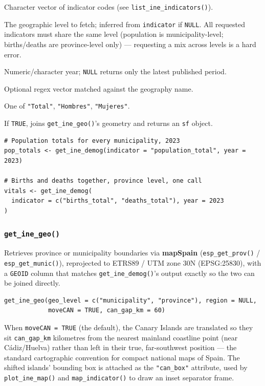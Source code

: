 \documentclass[11pt]{article}
\newcommand{\pkg}[1]{\textbf{#1}}
\newcommand{\fn}[1]{\texttt{#1}}
\begin{document}
\begin{description}[leftmargin=2.4cm,style=nextline]
  \item[indicator] Character vector of indicator codes (see
    \fn{list\_ine\_indicators()}).
  \item[geo\_level] The geographic level to fetch; inferred from
    \fn{indicator} if \fn{NULL}. All requested indicators must share the
    same level (population is municipality-level; births/deaths are
    province-level only) --- requesting a mix across levels is a hard error.
  \item[year] Numeric/character year; \fn{NULL} returns only the latest
    published period.
  \item[region] Optional regex vector matched against the geography name.
  \item[sex] One of \fn{"Total"}, \fn{"Hombres"}, \fn{"Mujeres"}.
  \item[geometry] If \fn{TRUE}, joins \fn{get\_ine\_geo()}'s geometry and
    returns an \fn{sf} object.
\end{description}

\begin{lstlisting}
# Population totals for every municipality, 2023
pop_totals <- get_ine_demog(indicator = "population_total", year = 2023)

# Births and deaths together, province level, one call
vitals <- get_ine_demog(
  indicator = c("births_total", "deaths_total"), year = 2023
)
\end{lstlisting}

\subsubsection{\fn{get\_ine\_geo()}}

Retrieves province or municipality boundaries via \pkg{mapSpain}
(\fn{esp\_get\_prov()} / \fn{esp\_get\_munic()}), reprojected to ETRS89 /
UTM zone 30N (EPSG:25830), with a \fn{GEOID} column that matches
\fn{get\_ine\_demog()}'s output exactly so the two can be joined directly.

\begin{lstlisting}
get_ine_geo(geo_level = c("municipality", "province"), region = NULL,
            moveCAN = TRUE, can_gap_km = 60)
\end{lstlisting}

When \fn{moveCAN = TRUE} (the default), the Canary Islands are translated so
they sit \fn{can\_gap\_km} kilometres from the nearest mainland coastline
point (near C\'{a}diz/Huelva) rather than left in their true, far-southwest
position --- the standard cartographic convention for compact national maps
of Spain. The shifted islands' bounding box is attached as the
\fn{"can\_box"} attribute, used by \fn{plot\_ine\_map()} and
\fn{map\_indicator()} to draw an inset separator frame.
\end{document}
